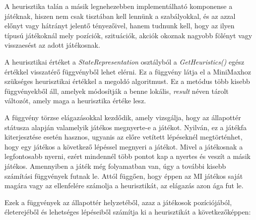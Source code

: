 \documentclass[
]{thesis-ekf}
\theoremstyle{definition}
\theoremstyle{remark}
\begin{document}
A heurisztika talán a másik legnehezebben implementálható komponense a játéknak, hiszen nem csak tisztában kell lennünk a szabályokkal, és az azzal előnyt vagy hátrányt jelentő tényezőivel, hanem tudnunk kell, hogy az ilyen típusú játékoknál mely pozíciók, szituációk, akciók okoznak nagyobb fölényt vagy visszaesést az adott játékosnak. 

A heurisztikai értéket a \emph{StateRepresentation} osztályból a \emph{GetHeuristics()} egész értékkel visszatérő függvényből lehet elérni. Ez a függvény látja el a MiniMaxhoz szükséges heurisztikai értékkel a megoldó algoritmust. Ez a metódus több kisebb függvényekből áll, amelyek módosítják a benne lokális, \emph{result} néven tárolt változót, amely maga a heurisztika értéke lesz. 

A függvény törzse elágazásokkal kezdődik, amely vizsgálja, hogy az állapottér státusza alapján valamelyik játékos megnyerte-e a játékot. Nyilván, ez a játékfa kiterjesztése esetén hasznos, ugyanis az előre vetített lépéseknél megtörténhet, hogy egy játékos a következő lépéssel megnyeri a játékot. Mivel a játékosnak a legfontosabb nyerni, ezért mindennél több pontot kap a nyertes és veszít a másik játékos. Amennyiben a játék még folyamatban van, úgy a további kisebb számítási függvények futnak le. Attól függően, hogy éppen az MI játékos saját magára vagy az ellenfelére számolja a heurisztikát, az elágazás azon ága fut le.

Ezek a függvények az állapottér helyzetéből, azaz a játékosok pozíciójából, életerejéből és lehetséges lépéseiből számítja ki a heurisztikát a következőképpen: 
\end{document}
